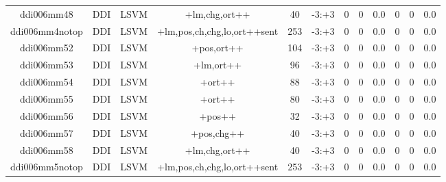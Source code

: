 \documentclass[a4paper]{article}
\begin{document}
\begin{landscape}
\begin{center}
\begin{tabular}{ |c|c|c|c|c|c|c|c|c|c|c|c|}
 
 	
 	\small{ ddi006mm48 } & \small{ DDI} & \small{  LSVM }  & +lm,chg,ort++  &  40 &  \small{  -3:+3 }  &  0 & 0 & 0.0  &  0 & 0 & 0.0 \\
 	

 
 	
 	\small{ ddi006mm4notop } & \small{ DDI} & \small{  LSVM }  & +lm,pos,ch,chg,lo,ort++sent  &  253 &  \small{  -3:+3 }  &  0 & 0 & 0.0  &  0 & 0 & 0.0 \\
 	

 
 	
 	\small{ ddi006mm52 } & \small{ DDI} & \small{  LSVM }  & +pos,ort++  &  104 &  \small{  -3:+3 }  &  0 & 0 & 0.0  &  0 & 0 & 0.0 \\
 	

 
 	
 	\small{ ddi006mm53 } & \small{ DDI} & \small{  LSVM }  & +lm,ort++  &  96 &  \small{  -3:+3 }  &  0 & 0 & 0.0  &  0 & 0 & 0.0 \\
 	

 
 	
 	\small{ ddi006mm54 } & \small{ DDI} & \small{  LSVM }  & +ort++  &  88 &  \small{  -3:+3 }  &  0 & 0 & 0.0  &  0 & 0 & 0.0 \\
 	

 
 	
 	\small{ ddi006mm55 } & \small{ DDI} & \small{  LSVM }  & +ort++  &  80 &  \small{  -3:+3 }  &  0 & 0 & 0.0  &  0 & 0 & 0.0 \\
 	

 
 	
 	\small{ ddi006mm56 } & \small{ DDI} & \small{  LSVM }  & +pos++  &  32 &  \small{  -3:+3 }  &  0 & 0 & 0.0  &  0 & 0 & 0.0 \\
 	

 
 	
 	\small{ ddi006mm57 } & \small{ DDI} & \small{  LSVM }  & +pos,chg++  &  40 &  \small{  -3:+3 }  &  0 & 0 & 0.0  &  0 & 0 & 0.0 \\
 	

 
 	
 	\small{ ddi006mm58 } & \small{ DDI} & \small{  LSVM }  & +lm,chg,ort++  &  40 &  \small{  -3:+3 }  &  0 & 0 & 0.0  &  0 & 0 & 0.0 \\
 	

 
 	
 	\small{ ddi006mm5notop } & \small{ DDI} & \small{  LSVM }  & +lm,pos,ch,chg,lo,ort++sent  &  253 &  \small{  -3:+3 }  &  0 & 0 & 0.0  &  0 & 0 & 0.0 \\
 	


\end{tabular}
\end{center}
\end{landscape}
\end{document}
